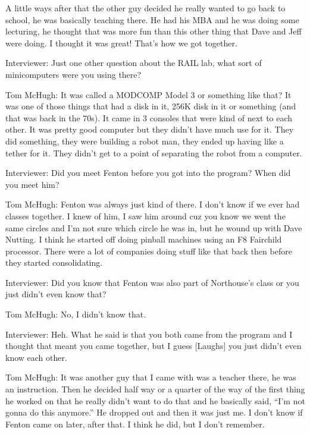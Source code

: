 A little ways after that the other guy decided he really wanted to go back to school, he was basically teaching there. He had his MBA and he was doing some lecturing, he thought that was more fun than this other thing that Dave and Jeff were doing. I thought it was great! That’s how we got together.

\textcolor{interviewer}{Interviewer:} Just one other question about the RAIL lab, what sort of minicomputers were you using there?

\textcolor{interviewee}{Tom McHugh:} It was called a MODCOMP Model 3 or something like that? It was one of those things that had a disk in it, 256K disk in it or something (and that was back in the 70s). It came in 3 consoles that were kind of next to each other. It was pretty good computer but they didn’t have much use for it. They did something, they were building a robot man, they ended up having like a tether for it. They didn’t get to a point of separating the robot from a computer.

\textcolor{interviewer}{Interviewer:} Did you meet Fenton before you got into the program? When did you meet him?

\textcolor{interviewee}{Tom McHugh:} Fenton was always just kind of there. I don’t know if we ever had classes together. I knew of him, I saw him around cuz you know we went the same circles and I’m not sure which circle he was in, but he wound up with Dave Nutting. I think he started off doing pinball machines using an F8 Fairchild processor. There were a lot of companies doing stuff like that back then before they started consolidating.

\textcolor{interviewer}{Interviewer:} Did you know that Fenton was also part of Northouse’s class or you just didn’t even know that?

\textcolor{interviewee}{Tom McHugh:} No, I didn’t know that.

\textcolor{interviewer}{Interviewer:} Heh. What he said is that you both came from the program and I thought that meant you came together, but I guess [Laughs] you just didn’t even know each other.

\textcolor{interviewee}{Tom McHugh:} It was another guy that I came with was a teacher there, he was an instruction. Then he decided half way or a quarter of the way of the first thing he worked on that he really didn’t want to do that and he basically said, “I’m not gonna do this anymore.” He dropped out and then it was just me. I don’t know if Fenton came on later, after that. I think he did, but I don’t remember.

